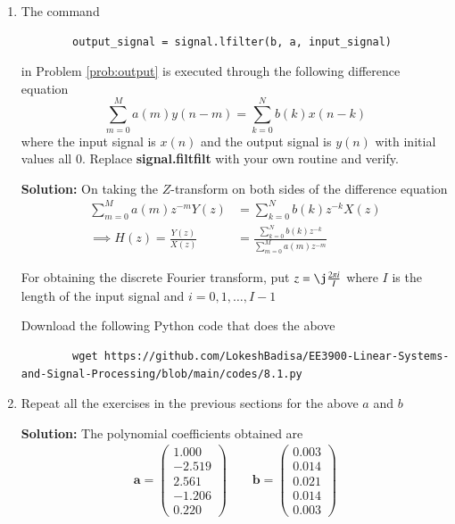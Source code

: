 \documentclass[journal,12pt,twocolumn]{IEEEtran}
\newcommand{\solution}{\noindent \textbf{Solution: }}
\providecommand{\brak}[1]{\ensuremath{\left(#1\right)}}
\let\vec\mathbf
\numberwithin{equation}{section}
\renewcommand\thesection{\arabic{section}}
\newcommand{\myvec}[1]{\ensuremath{\begin{pmatrix}#1\end{pmatrix}}}
\begin{document}
	\begin{enumerate}[label=\thesection.\arabic*]
	\item The command
	\begin{lstlisting}
		output_signal = signal.lfilter(b, a, input_signal)
	\end{lstlisting}
	in Problem \ref{prob:output} is executed through the following difference equation
	\begin{equation}
		\label{eq:iir_filter_gen}
 		\sum _{m=0}^{M}a\brak{m}y\brak{n-m}=\sum _{k=0}^{N}b\brak{k}x\brak{n-k}
	\end{equation}
	where the input signal is $x(n)$ and the output signal is $y(n)$ with initial values all 0. Replace \textbf{signal.filtfilt} with your own routine and verify.
	
	\solution On taking the $Z$-transform on both sides of the difference equation
	\begin{align}
		\sum _{m=0}^{M}a\brak{m} z^{-m} Y(z) &= \sum _{k=0}^{N}b\brak{k} z^{-k} X(z) \\
		\implies H(z) = \frac{Y(z)}{X(z)} &= \frac{\sum _{k=0}^{N}b\brak{k} z^{-k}}{\sum _{m=0}^{M}a\brak{m} z^{-m	}}
	\end{align}
	
	For obtaining the discrete Fourier transform, put $z = \j \frac{2\pi i}{I}$ where $I$ is the length of the input signal and $i = 0, 1, \ldots, I-1$
	
	Download the following Python code that does the above
	\begin{lstlisting}
		wget https://github.com/LokeshBadisa/EE3900-Linear-Systems-and-Signal-Processing/blob/main/codes/8.1.py
	\end{lstlisting}
	
	\item Repeat all the exercises in the previous sections for the above $a$ and $b$
	
	\solution The polynomial coefficients obtained are
	\begin{align}
		\vec{a} = \myvec{1.000 \\ -2.519 \\ 2.561 \\ -1.206 \\ 0.220} \qquad
		\vec{b} = \myvec{0.003 \\ 0.014 \\ 0.021 \\ 0.014 \\ 0.003}
	\end{align}
	

\end{enumerate}
\end{document}
